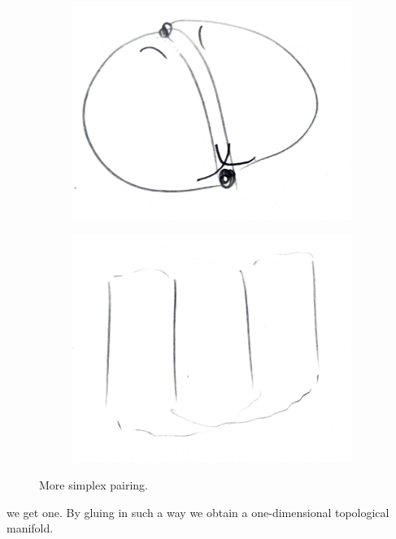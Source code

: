 \documentclass[10pt,a4paper,twoside,openany,hidelinks]{book}
\begin{document}
\begin{figure}[!tbp]
  \begin{subfigure}[b]{0.4\textwidth}
    \includegraphics[width=\textwidth]{sources/4_2a}
  \end{subfigure}
  \hfill
  \begin{subfigure}[b]{0.4\textwidth}
    \includegraphics[width=\textwidth]{sources/4_2b}
  \end{subfigure}
  \caption{More simplex pairing.}
  \label{simplex:pairing2}
\end{figure}
we get one.
By gluing in such a way we obtain a one-dimensional topological manifold.
\end{document}
